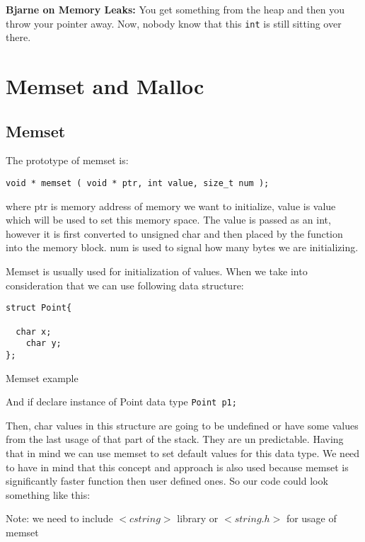 \documentclass[11pt, a4paper]{article}
\begin{document}
\textbf{Bjarne on Memory Leaks:} You get something from the heap and then you throw your pointer away. Now, nobody know that this \texttt{int} is still sitting over there. 




\section{Memset and Malloc}%
\label{sec:memset_and_malloc}

\subsection{Memset}%
\label{sub:memset}

The prototype of memset is:

\texttt{void * memset ( void * ptr, int value, size\_t num );} 


where ptr is memory address of memory we want to initialize, value is value which will be used to set this memory space. The value is passed as an int, however it is first converted to unsigned char and then placed by the function into the memory block. num is used to signal how many bytes we are initializing.

Memset is usually used for initialization of values. When we take into consideration that we can use following data structure:



\begin{listing}
\begin{verbatim}
struct Point{

  char x;
	char y;
};
\end{verbatim}
\caption{Memset example}
\label{lst:memset_example}
\end{listing}


And if declare instance of Point data type \texttt{Point p1;} 

Then, char values in this structure are going to be undefined or have some values from the last usage of that part of the stack. They are un predictable. Having that in mind we can use memset to set default values for this data type. We need to have in mind that this concept and approach is also used because memset is significantly faster function then user defined ones. So our code could look something like this:


Note: we need to include $<cstring>$ library or $<string.h>$ for usage of memset
\end{document}
